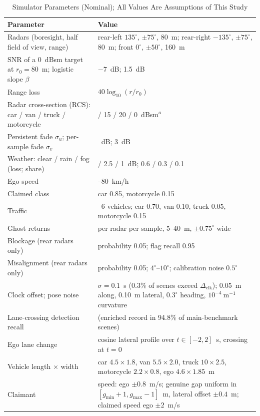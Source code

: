 \begin{table}[!t]
\centering
\footnotesize
\caption{Simulator Parameters (Nominal); All Values Are Assumptions of This Study}
\label{tab:sim}
\renewcommand{\arraystretch}{1.15}
\begin{tabular}{>{\raggedright\arraybackslash}p{6cm}>{\raggedright\arraybackslash}p{10.6cm}}
\toprule
\textbf{Parameter} & \textbf{Value} \\
\midrule
Radars (boresight, half field of view, range) & rear-left $135^\circ$, $\pm 75^\circ$, 80~m; rear-right $-135^\circ$, $\pm 75^\circ$, 80~m; front $0^\circ$, $\pm 50^\circ$, 160~m \\
SNR of a 0~dBsm target at $r_0 = 80$~m; logistic slope $\beta$ & $-7$~dB; 1.5~dB \\
Range loss & $40 \log_{10}(r/r_0)$ \\
Radar cross-section (RCS): car / van / truck / motorcycle & 10 / 15 / 20 / 0~dBsm$^{a}$ \\
Persistent fade $\sigma_u$; per-sample fade $\sigma_v$ & 4~dB; 3~dB \\
Weather: clear / rain / fog (loss; share) & 0 / 2.5 / 1~dB; 0.6 / 0.3 / 0.1 \\
Ego speed & 50--80~km/h \\
Claimed class & car 0.85, motorcycle 0.15 \\
Traffic & 0--6 vehicles; car 0.70, van 0.10, truck 0.05, motorcycle 0.15 \\
Ghost returns & 0.03 per radar per sample, 5--40~m, $\pm 0.75^\circ$ wide \\
Blockage (rear radars only) & probability 0.05; flag recall 0.95 \\
Misalignment (rear radars only) & probability 0.05; $4^\circ$--$10^\circ$; calibration noise $0.5^\circ$ \\
Clock offset; pose noise & $\sigma = 0.1$~s (0.3\% of scenes exceed $\Delta_{\mathrm{clk}}$); 0.05~m along, 0.10~m lateral, $0.3^\circ$ heading, $10^{-4}~\mathrm{m}^{-1}$ curvature \\
Lane-crossing detection recall & 0.95 (enriched record in 94.8\% of main-benchmark scenes) \\
Ego lane change & cosine lateral profile over $t \in [-2, 2]$~s, crossing at $t = 0$ \\
Vehicle length $\times$ width & car $4.5 \times 1.8$, van $5.5 \times 2.0$, truck $10 \times 2.5$, motorcycle $2.2 \times 0.8$, ego $4.6 \times 1.85$~m \\
Claimant & speed: ego $\pm 0.8$~m/s; genuine gap uniform in $[g_{\min} + 1, g_{\max} - 1]$~m, lateral offset $\pm 0.4$~m; claimed speed ego $\pm 2$~m/s \\

\end{tabular}
\end{table}
